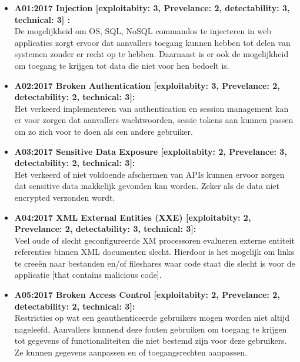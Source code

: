 \begin{itemize}


\item \textbf{A01:2017 Injection [exploitabity: 3, Prevelance: 2, detectability: 3, technical: 3] :} \\De mogelijkheid om OS, SQL, NoSQL commandos te injecteren in web applicaties zorgt ervoor dat aanvallers toegang kunnen hebben tot delen van systemen zonder er recht op te hebben. Daarnaast is er ook de mogelijkheid om toegang te krijgen tot data die niet voor hen bedoelt is.

\item \textbf{A02:2017 Broken Authentication [exploitabity: 3, Prevelance: 2, detectability: 2, technical: 3]:}\\ Het verkeerd implementeren van authentication en session management kan er voor zorgen dat aanvallers wachtwoorden, sessie tokens aan kunnen passen om zo zich voor te doen als een andere gebruiker.

\item \textbf{A03:2017 Sensitive Data Exposure [exploitabity: 2, Prevelance: 3, detectability: 2, technical: 3]:}\\
Het verkeerd of niet voldoende afschermen van APIs kunnen ervoor zorgen dat sensitive data makkelijk gevonden kan worden. Zeker als de data niet encrypted verzonden wordt.

\item \textbf{A04:2017 XML External Entities (XXE) [exploitabity: 2, Prevelance: 2, detectability: 3, technical: 3]:}\\
Veel oude of slecht geconfigureerde XM processoren evalueren externe entiteit referenties binnen XML documenten slecht. Hierdoor is het mogelijk om links te cree\"en naar bestanden en/of fileshares waar code staat die slecht is voor de applicatie [that contains malicious code].

\item \textbf{A05:2017 Broken Access Control [exploitabity: 2, Prevelance: 2, detectability: 2, technical: 3]:}\\
Restricties op wat een geauthenticeerde gebruikers mogen worden niet altijd nageleefd, Aanvallers kunnend deze fouten gebruiken om toegang te krijgen tot gegevens of functionaliteiten die niet bestemd zijn voor deze gebruikers. Ze kunnen gegevens aanpassen en of toegangsrechten aanpassen.


\end{itemize}
